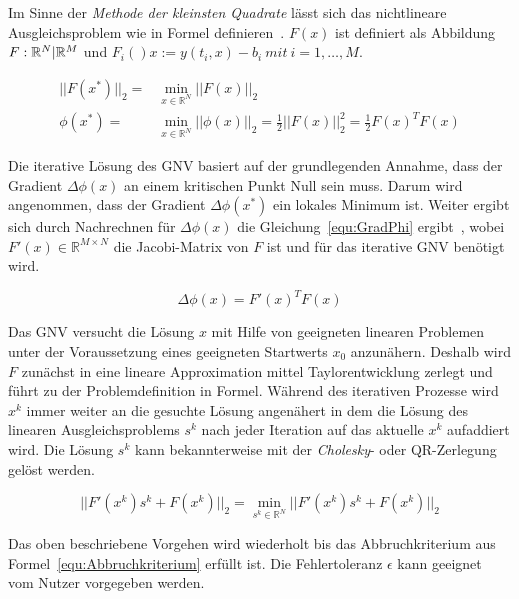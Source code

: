 Im Sinne der \textit{Methode der kleinsten Quadrate} lässt sich das nichtlineare Ausgleichsproblem wie in Formel definieren~\cite{schwarz2011numerische}. $F(x)$ ist definiert als Abbildung $F: \mathbb{R}^N \arrowvert \mathbb{R}^M$ und $F_i()x:= y(t_i,x)-b_i\ mit\ i= 1,\dots,M$. 

\begin{equation}
\label{equ:LinAusgleich}
\begin{aligned}
||F(x^*)||_2 =& \min_{x\in \mathbb{R}^N} ||F(x)||_2\\
\phi(x^*)=& \min_{x\in \mathbb{R}^N} ||\phi(x)||_2 = \frac{1}{2}||F(x)||_2^2 = \frac{1}{2}F(x)^TF(x)
\end{aligned}
\end{equation}

Die iterative Lösung des GNV basiert auf der grundlegenden Annahme, dass der Gradient $\Delta\phi(x)$ an einem kritischen Punkt Null sein muss. Darum wird angenommen, dass der Gradient $\Delta\phi(x^*)$ ein lokales Minimum ist. Weiter ergibt sich durch Nachrechnen für $\Delta\phi(x)$ die Gleichung~\ref{equ:GradPhi} ergibt~\cite{dahmen2008numerik}, wobei $F'(x) \in \mathbb{R}^{M \times N}$ die Jacobi-Matrix von $F$ ist und für das iterative GNV benötigt wird.


\begin{equation}
\label{equ:GradPhi}
\Delta\phi(x)=F'(x)^TF(x)
\end{equation}

Das GNV versucht die Lösung $x$ mit Hilfe von geeigneten linearen Problemen unter der Voraussetzung eines geeigneten Startwerts $x_0$ anzunähern. Deshalb wird $F$ zunächst in eine lineare Approximation mittel Taylorentwicklung zerlegt und führt zu der Problemdefinition in Formel. Während des iterativen Prozesse wird $x^k$ immer weiter an die gesuchte Lösung angenähert in dem die Lösung des linearen Ausgleichsproblems $s^k$ nach jeder Iteration auf das aktuelle $x^k$ aufaddiert wird. Die Lösung $s^k$ kann bekannterweise mit der \textit{Cholesky}- oder QR-Zerlegung gelöst werden.

\begin{equation}
\label{equ:Newton}
||F'(x^k)s^k+F(x^k)||_2 = \min_{s^k \in \mathbb{R}^N}||F'(x^k)s^k+F(x^k)||_2
\end{equation}

Das oben beschriebene Vorgehen wird wiederholt bis das Abbruchkriterium aus Formel~\ref{equ:Abbruchkriterium} erfüllt ist. Die Fehlertoleranz $\epsilon$ kann geeignet vom Nutzer vorgegeben werden.

